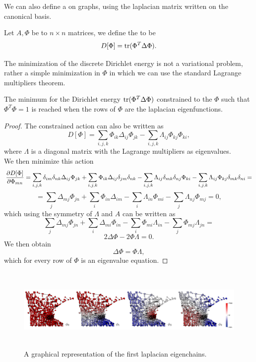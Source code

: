 \documentclass[../2.tex]{subfiles}
\begin{document}
We can also define a  on graphs, using the laplacian matrix written on the canonical basis.

\begin{defn}
    Let $A,\Phi$ be to $n\times n$ matrices, we define the  to be 
    \[ D[\Phi] = \operatorname{tr}(\Phi^T \Delta \Phi). \]
\end{defn}

The minimization of the discrete Dirichlet energy is not a variational problem, rather a simple minimization in $\Phi$ in which we can 
use the standard Lagrange multipliers theorem.

\begin{prop}
    The minimum for the Dirichlet energy $ \operatorname{tr}(\Phi^T \Delta \Phi)$ constrained to the $\Phi$ such that $\Phi^T \Phi = 1$ is reached when the
    rows of $\Phi$ are the laplacian eigenfunctions.
\end{prop}
\begin{proof}
    The constrained action can also be written as
    \[ D[\Phi] = \sum_{i,j,k} \Phi_{ik} \Delta_{ij} \Phi_{jk} - \sum_{i,j,k} \Lambda_{ij} \Phi_{kj} \Phi_{ki}, \]
    where $\Lambda$ is a diagonal matrix with the Lagrange multipliers as eigenvalues.\\ We then minimize this action 
    \[ \frac{\partial D[\Phi]}{\partial \Phi_{mn}} = \sum_{i,j,k} \delta_{im}\delta_{nk}\Delta_{ij} \Phi_{jk} + \sum_{i,j,k} \Phi_{ik} \Delta_{ij}\delta_{jm}\delta_{nk}
    - \sum_{i,j,k} \Lambda_{ij} \delta_{mk}\delta_{nj}\Phi_{ki} - \sum_{i,j,k} \Lambda_{ij} \Phi_{kj} \delta_{mk}\delta_{ni} =  \]
    \[ = \sum_{j} \Delta_{mj} \Phi_{jn} + \sum_{i} \Phi_{in} \Delta_{im} - \sum_{i} \Lambda_{in} \Phi_{mi} - \sum_{j} \Lambda_{nj} \Phi_{mj} = 0, \]
    which using the symmetry of $\Lambda$ and $A$ can be written as
    \[ \sum_{j} \Delta_{mj} \Phi_{jn} + \sum_{i}  \Delta_{mi} \Phi_{in} - \sum_{i} \Phi_{mi}\Lambda_{in} - \sum_{j} \Phi_{mj} \Lambda_{jn} =  \]
    \[ 2\Delta\Phi - 2\Phi\Lambda = 0. \]
    We then obtain 
    \[ \Delta\Phi = \Phi\Lambda, \]
    which for every row of $\Phi$ is an eigenvalue equation. \qedhere
\end{proof}

\begin{figure}[H]
    \centering
    \includegraphics[width=17cm, height=4cm]{sections/2/eiglap}
    \caption{A graphical representation of the first laplacian eigenchains.}
    \label{fig:2:5}
\end{figure}

    
\end{document}
